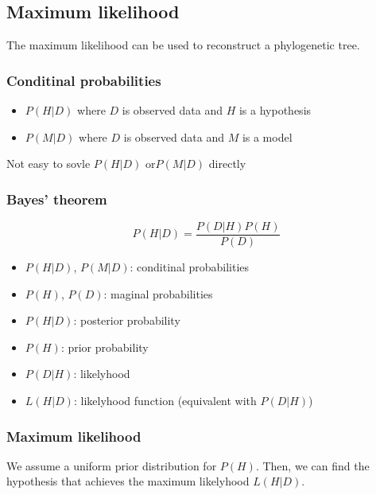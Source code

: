 %
%

%
%
\subsection{Maximum likelihood}
The maximum likelihood can be used to reconstruct a phylogenetic tree.

%
%
\subsubsection*{Conditinal probabilities}
\begin{itemize}
\item $P(H|D)$ where $D$ is observed data and $H$ is a hypothesis
\item $P(M|D)$ where $D$ is observed data and $M$ is a model
\end{itemize}

\noindent
Not easy to sovle $P(H|D)$ or$ P(M|D)$ directly

%
%
\subsubsection*{Bayes' theorem}
\medskip 

\[
P(H|D) = \dfrac{P(D|H)P(H)}{P(D)}
\]

\begin{itemize}
\item $P(H|D)$, $P(M|D)$: conditinal probabilities
\item $P(H)$, $P(D)$: maginal probabilities
\item $P(H|D)$: posterior probability
\item $P(H)$: prior probability
\item $P(D|H)$: likelyhood
\item $L(H|D)$: likelyhood function (equivalent with $P(D|H)$)
\end{itemize}

%
%
\subsubsection*{Maximum likelihood}
We assume a uniform prior distribution for $P(H)$. Then, we can find the hypothesis that achieves the maximum likelyhood $L(H|D)$. \\


